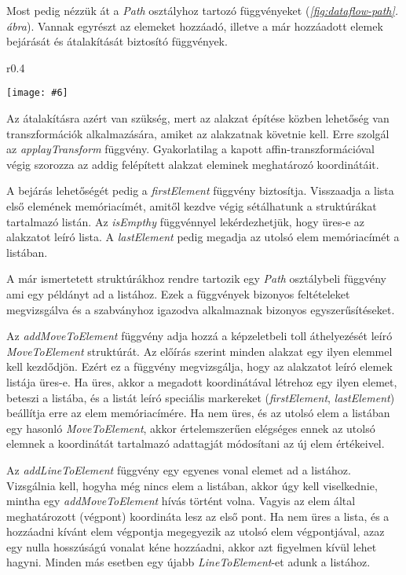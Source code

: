 \documentclass[12pt]{report}
\makeatletter
\theoremstyle{definition}
\newcommand{\func}[1]{{\textsl{#1}}}
\newcommand{\melyikoldalra}{r}
\newlength{\Xoffset}
\newlength{\Yoffset}
\newcommand*{\setpdfoffset}[2]{%
  \setlength{\Xoffset}{#1}%
  \setlength{\Yoffset}{#2}%
}
\newcommand*{\setviewport}[4]{%
  \def\x@viewport{%
    {\the\dimexpr#1-\Xoffset}
    {\the\dimexpr#2-\Yoffset}
    {\the\dimexpr#3-\Xoffset}
    {\the\dimexpr#4-\Yoffset}%
  }%
}
\newcommand{\includegraphicskivagas}[6]{
    \setpdfoffset{0pt}{0pt}
    \setviewport{#1}{#2}{#3}{#4}
    \texttt{[image: \#6]}
}
\newcommand{\includedataflowkivagas}[5]{
    \includegraphicskivagas{#1}{#2}{#3}{#4}{scale=0.6,#5}
    {img/built/dataflow_eps}
}
\makeatother
\begin{document}
Most pedig nézzük át a \func{Path} osztályhoz tartozó függvényeket
(\emph{\ref{fig:dataflow-path}. ábra}). Vannak egyrészt az elemeket
hozzáadó, illetve a már hozzáadott elemek bejárását és átalakítását biztosító
függvények.

  \begin{wrapfigure}{\melyikoldalra}{0.4\textwidth}
    \begin{center}
      \includedataflowkivagas{153pt}{355pt}{345pt}{595pt}{}
    \end{center}
    \caption{\label{fig:dataflow-path} A belső Path API részei \\ (Részlet az
    \emph{\ref{appendix:dataflow}. folyamatábrából}.)}
  \end{wrapfigure}

Az átalakításra azért van szükség, mert az alakzat építése közben lehetőség van
transzformációk alkalmazására, amiket az alakzatnak követnie kell. Erre szolgál
az \func{applayTransform} függvény. Gyakorlatilag a kapott
affin-transzformációval végig szorozza az addig felépített alakzat eleminek
meghatározó koordinátáit.

A bejárás lehetőségét pedig a \func{firstElement} függvény biztosítja.
Visszaadja a lista első elemének memóriacímét, amitől kezdve végig sétálhatunk
a struktúrákat tartalmazó listán. Az \func{isEmpthy} függvénnyel
lekérdezhetjük, hogy üres-e az alakzatot leíró lista. A \func{lastElement}
pedig megadja az utolsó elem memóriacímét a listában.

A már ismertetett struktúrákhoz rendre tartozik egy \func{Path} osztálybeli
függvény ami egy példányt ad a listához. Ezek a függvények bizonyos
feltételeket megvizsgálva és a szabványhoz igazodva alkalmaznak bizonyos
egyszerűsítéseket.

Az \func{addMoveToElement} függvény adja hozzá a képzeletbeli toll áthelyezését
leíró \func{MoveToElement} struktúrát. Az előírás szerint minden alakzat egy
ilyen elemmel kell kezdődjön. Ezért ez a függvény megvizsgálja, hogy az
alakzatot leíró elemek listája üres-e. Ha üres, akkor a megadott koordinátával
létrehoz egy ilyen elemet, beteszi a listába, és a listát leíró speciális
markereket (\func{firstElement}, \func{lastElement}) beállítja erre az elem
memóriacímére. Ha nem üres, és az utolsó elem a listában egy hasonló
\func{MoveToElement}, akkor értelemszerűen elégséges ennek az utolsó elemnek a
koordinátát tartalmazó adattagját módosítani az új elem értékeivel.

Az \func{addLineToElement} függvény egy egyenes vonal elemet ad a listához.
Vizsgálnia kell, hogyha még nincs elem a listában, akkor úgy kell viselkednie,
mintha egy \func{addMoveToElement} hívás történt volna. Vagyis az elem által
meghatározott (végpont) koordináta lesz az első pont. Ha nem üres a lista, és a
hozzáadni kívánt elem végpontja megegyezik az utolsó elem végpontjával, azaz
egy nulla hosszúságú vonalat kéne hozzáadni, akkor azt figyelmen kívül lehet
hagyni. Minden más esetben egy újabb \func{LineToElement}-et adunk a listához.
\end{document}
